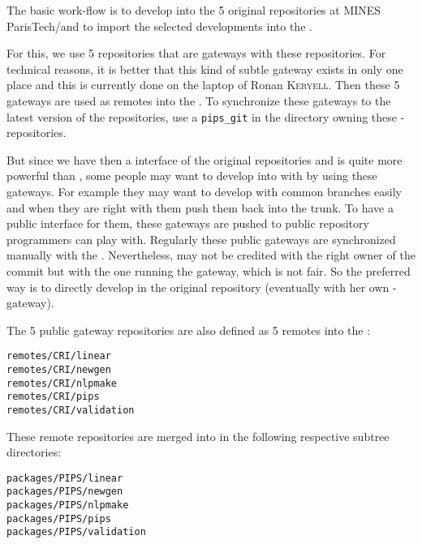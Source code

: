 \documentclass[a4paper]{article}
\begin{document}
The basic \Apips work-flow is to develop into the 5 original \Apips{}
\Asvn repositories at MINES ParisTech/\Acri and to import the selected
developments into the \Apfa{} \Agit.

For this, we use 5 \Agit repositories that are gateways with these \Asvn
repositories. For technical reasons, it is better that this kind of subtle
gateway exists in only one place and this is currently done on the laptop
of Ronan \textsc{Keryell}. Then these 5 gateways are used as remotes into
the \Apfa{} \Agit. To synchronize these gateways to the latest version of
the \Apips{} \Asvn repositories, use a \verb|pips_git| in the directory
owning these \Agit-\Asvn repositories.

But since we have then a \Agit interface of the original \Apips{} \Asvn
repositories and \Agit is quite more powerful than \Asvn, some people may
want to develop into \Apips with \Agit by using these gateways. For
example they may want to develop with common branches easily and when they
are right with them push them back into the \Apips{} \Asvn trunk. To have
a public interface for them, these \Agit gateways are pushed to public
\Agit repository programmers can play with. Regularly these public
gateways are synchronized manually with the \Apips{} \Asvn. Nevertheless,
\Asvn may not be credited with the right owner of the commit but with the
one running the gateway, which is not fair. So the preferred way is to
directly develop in the original \Apips \Asvn repository (eventually with
her own \Agit-\Asvn gateway).

The 5 public gateway \Agit repositories are also defined as 5 remotes into
the \Apfa{} \Agit:
\begin{description}
\item[\texttt{remotes/CRI/linear}]
\item[\texttt{remotes/CRI/newgen}]
\item[\texttt{remotes/CRI/nlpmake}]
\item[\texttt{remotes/CRI/pips}]
\item[\texttt{remotes/CRI/validation}]
\end{description}

These remote repositories are merged into \Apfa in the following
respective subtree directories:
\begin{description}
\item[\texttt{packages/PIPS/linear}]
\item[\texttt{packages/PIPS/newgen}]
\item[\texttt{packages/PIPS/nlpmake}]
\item[\texttt{packages/PIPS/pips}]
\item[\texttt{packages/PIPS/validation}]
\end{description}
\end{document}
